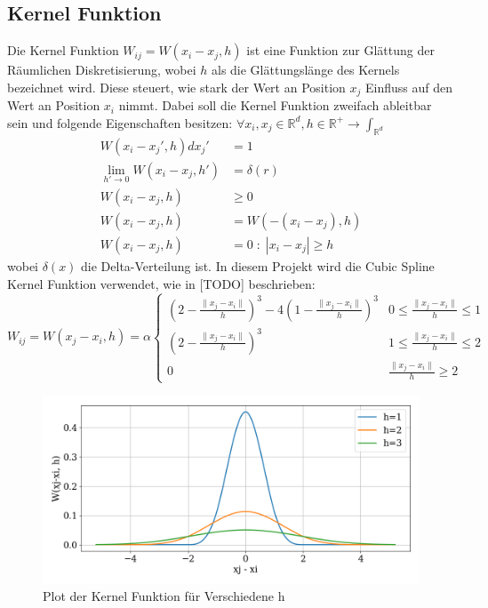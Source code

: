 \documentclass[a4paper, 12pt]{article}
\begin{document}
\subsection{Kernel Funktion}
Die Kernel Funktion \(W_{ij} = W(x_i - x_j, h)\) ist eine Funktion zur Glättung der Räumlichen Diskretisierung, wobei \(h\) als die Glättungslänge des Kernels bezeichnet wird. Diese steuert, wie stark der Wert an Position \(x_j\) Einfluss auf den Wert an Position \(x_i\) nimmt. Dabei soll die Kernel Funktion zweifach ableitbar sein und folgende Eigenschaften besitzen: \(\forall x_i, x_j \in \mathds{R}^d, h\in \mathds{R}^+ \rightarrow \int_{\mathds{R}^d}\)
\begin{align}
	W(x_i - x_j', h) dx_j' &= 1 \label{kernelEigenschaft1}\\
	\lim_{h'\rightarrow 0} W(x_i - x_j, h') &= \delta(r) \label{kernelEigenschaft2}\\
	W(x_i - x_j, h) &\geq 0 \label{kernelEigenschaft3}\\
	W(x_i - x_j, h) &= W(-(x_i - x_j), h) \label{kernelEigenschaft4}\\
	W(x_i - x_j, h) &= 0\;:\; |x_i - x_j| \geq h \label{kernelEigenschaft5}
\end{align}
wobei \(\delta(x)\) die Delta-Verteilung ist. 
In diesem Projekt wird die Cubic Spline Kernel Funktion verwendet, wie in [TODO] beschrieben:
\begin{equation*}
	W_{ij} = W(x_j - x_i, h) = \alpha \begin{cases} 
	(2-\frac{\|x_j - x_i\|}{h})^3 - 4(1-\frac{\|x_j - x_i\|}{h})^3 & 0 \leq \frac{\|x_j - x_i\|}{h} \leq 1\\
	(2-\frac{\|x_j - x_i\|}{h})^3 & 1 \leq \frac{\|x_j - x_i\|}{h} \leq 2 \\
	0 & \frac{\|x_j - x_i\|}{h} \geq 2 
	\end{cases}
\end{equation*}

\begin{figure}[H]
	\centering
	\includegraphics[width=\textwidth]{graphics/KernelPlot.png}
	\caption{Plot der Kernel Funktion für Verschiedene h}
\end{figure}
\end{document}
